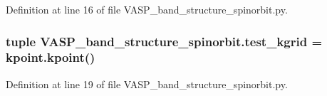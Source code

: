 Definition at line 16 of file V\+A\+S\+P\+\_\+band\+\_\+structure\+\_\+spinorbit.\+py.

\hypertarget{namespace_v_a_s_p__band__structure__spinorbit_a27cd60622cfcc42b5a5145d09f7ca38f}{
\subsubsection[{test\+\_\+kgrid}]{\setlength{\rightskip}{0pt plus 5cm}tuple V\+A\+S\+P\+\_\+band\+\_\+structure\+\_\+spinorbit.\+test\+\_\+kgrid = kpoint.\+kpoint()}}\label{namespace_v_a_s_p__band__structure__spinorbit_a27cd60622cfcc42b5a5145d09f7ca38f}


Definition at line 19 of file V\+A\+S\+P\+\_\+band\+\_\+structure\+\_\+spinorbit.\+py.

